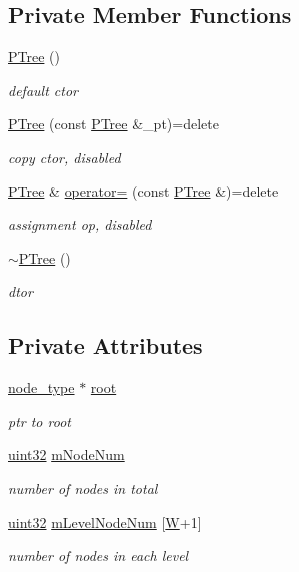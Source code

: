 \subsection*{Private Member Functions}
\begin{DoxyCompactItemize}
\item 
\hyperlink{classPTree_ab6a6d94a37c3150c2f74b10fe42ad1f6}{P\-Tree} ()
\begin{DoxyCompactList}\small\item\em default ctor \end{DoxyCompactList}\item 
\hyperlink{classPTree_a992264de413031fecb0145407f9eb060}{P\-Tree} (const \hyperlink{classPTree}{P\-Tree} \&\-\_\-pt)=delete
\begin{DoxyCompactList}\small\item\em copy ctor, disabled \end{DoxyCompactList}\item 
\hyperlink{classPTree}{P\-Tree} \& \hyperlink{classPTree_ab0ef7f0ccff4d5f1a8715cda9875ecd8}{operator=} (const \hyperlink{classPTree}{P\-Tree} \&)=delete
\begin{DoxyCompactList}\small\item\em assignment op, disabled \end{DoxyCompactList}\item 
\hyperlink{classPTree_a539f6a563bcb9e00d18efa661546d0ca}{$\sim$\-P\-Tree} ()
\begin{DoxyCompactList}\small\item\em dtor \end{DoxyCompactList}\end{DoxyCompactItemize}
\subsection*{Private Attributes}
\begin{DoxyCompactItemize}
\item 
\hyperlink{classPTree_ad1004ef68aec722b83a6055ad8e9db55}{node\-\_\-type} $\ast$ \hyperlink{classPTree_ae87b3a544e048520a900456177af6e03}{root}
\begin{DoxyCompactList}\small\item\em ptr to root \end{DoxyCompactList}\item 
\hyperlink{types_8h_abd01e8e67e3d94cab04ecaaf4f85ac1b}{uint32} \hyperlink{classPTree_a3b5c4d673f63afded23d7ab31174d02d}{m\-Node\-Num}
\begin{DoxyCompactList}\small\item\em number of nodes in total \end{DoxyCompactList}\item 
\hyperlink{types_8h_abd01e8e67e3d94cab04ecaaf4f85ac1b}{uint32} \hyperlink{classPTree_aa4ae1d4235346aba797878a0415dc41b}{m\-Level\-Node\-Num} \mbox{[}\hyperlink{test__u128_8cpp_ab21b528bc38899d04d3a7053e52fb797}{W}+1\mbox{]}
\begin{DoxyCompactList}\small\item\em number of nodes in each level \end{DoxyCompactList}\end{DoxyCompactItemize}
